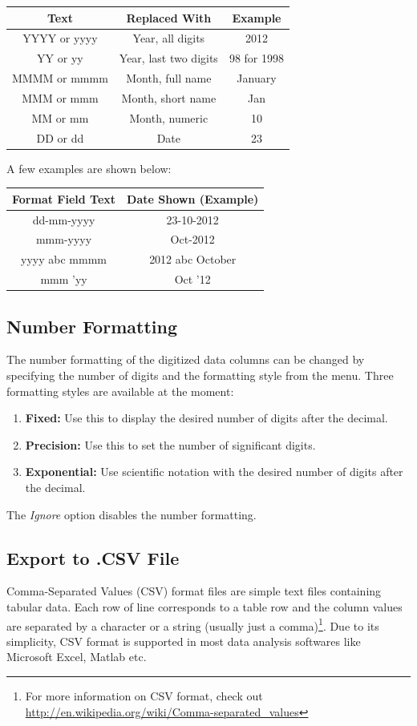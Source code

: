 \documentclass[letterpaper, 10pt]{article}
\begin{document}
\begin{center}
\begin{tabular}{|c|c|c|}
\hline
Text & Replaced With & Example\\
\hline
YYYY or yyyy & Year, all digits & 2012\\
YY or yy & Year, last two digits & 98 for 1998\\
MMMM or mmmm & Month, full name & January\\
MMM or mmm & Month, short name & Jan\\
MM or mm & Month, numeric & 10\\
DD or dd & Date & 23\\
\hline
\end{tabular}
\end{center}

A few examples are shown below:

\begin{center}
\begin{tabular}{|c|c|}
\hline
Format Field Text & Date Shown (Example)\\
\hline
dd-mm-yyyy & 23-10-2012\\
mmm-yyyy & Oct-2012\\
yyyy abc mmmm & 2012 abc October\\
mmm 'yy & Oct '12\\
\hline
\end{tabular}
\end{center}

\subsection{Number Formatting}
The number formatting of the digitized data columns can be changed by specifying the number of digits and the formatting style from the menu. Three formatting styles are available at the moment: 
\begin{enumerate}
\item{{\bf Fixed:} Use this to display the desired number of digits after the decimal.}
\item{{\bf Precision:} Use this to set the number of significant digits.}
\item{{\bf Exponential: } Use scientific notation with the desired number of digits after the decimal.}
\end{enumerate}
The \emph{Ignore} option disables the number formatting.

\subsection{Export to .CSV File}
Comma-Separated Values (CSV) format files are simple text files containing tabular data. Each row of line corresponds to a table row and the column values are separated by a character or a string (usually just a comma)\footnote{For more information on CSV format, check out \url{http://en.wikipedia.org/wiki/Comma-separated_values}}. Due to its simplicity, CSV format is supported in most data analysis softwares like Microsoft Excel, Matlab etc.
\end{document}
